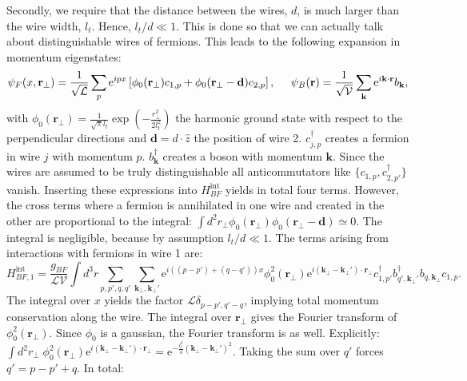 Secondly, we require that the distance between the wires, $d$, is much larger than the wire width, $l_t$. Hence, $l_t/d \ll 1$. This is done so that we can actually talk about distinguishable wires of fermions. This leads to the following expansion in momentum eigenstates:
\begin{equation}
\psi_F(x,\mathbf{r}_\perp) = \frac{1}{\sqrt{\mathcal{L}}}\sum_p \text{e}^{ipx} \left[\phi_0(\mathbf{r}_\perp) c_{1,p} + \phi_0(\mathbf{r}_\perp - \mathbf{d}) c_{2,p}\right], \hspace{0.5cm} \psi_B(\mathbf{r}) = \frac{1}{\sqrt{\mathcal{V}}}\sum_{\mathbf{k}} \text{e}^{i\mathbf{k}\cdot \mathbf{r}} b_\mathbf{k}, 
\end{equation}  
with $\phi_0(\mathbf{r}_\perp) = \frac{1}{\sqrt{\pi}l_t}\exp\left(-\frac{r_\perp^2}{2l_t^2}\right)$ the harmonic ground state with respect to the perpendicular directions and $\mathbf{d} = d\cdot\hat{z}$ the position of wire 2. $c^\dagger_{j,p}$ creates a fermion in wire $j$ with momentum $p$. $b^\dagger_\mathbf{k}$ creates a boson with momentum $\mathbf{k}$. Since the wires are assumed to be truly distinguishable all anticommutators like $\{c_{1,p}, c^\dagger_{2,p'}\}$ vanish. Inserting these expressions into $H_{BF}^\text{int}$ yields in total four terms. However, the cross terms where a fermion is annihilated in one wire and created in the other are proportional to the integral: $\int d^2 r_\perp \phi_0(\mathbf{r}_\perp)\phi_0(\mathbf{r}_\perp-\mathbf{d}) \simeq 0$. The integral is negligible, because by assumption $l_t/d \ll 1$. The terms arising from interactions with fermions in wire 1 are:
\begin{equation}
H_{BF, 1}^{\text{int}} = \frac{g_{BF}}{\mathcal{LV}}\int d^3 r \sum_{p,p',q,q'}\sum_{\mathbf{k}_{\perp},\mathbf{k}_{\perp}'}\text{e}^{i((p-p')+(q-q'))x} \phi^2_0(\mathbf{r}_{\perp})\text{e}^{i(\mathbf{k}_{\perp} - \mathbf{k}_{\perp}')\cdot \mathbf{r}_\perp} c^\dagger_{1,p'} b^\dagger_{q',\mathbf{k}_\perp'}b_{q,\mathbf{k}_\perp}c_{1,p}. \nonumber
\end{equation}
The integral over $x$ yields the factor $\mathcal{L}\delta_{p-p',q'-q}$, implying total momentum conservation along the wire. The integral over $\mathbf{r}_\perp$ gives the Fourier transform of $\phi_0^2(\mathbf{r}_\perp)$. Since $\phi_0$ is a gaussian, the Fourier transform is as well. Explicitly: $\int d^2 r_\perp \; \phi^2_0(\mathbf{r}_{\perp})\text{e}^{i(\mathbf{k}_{\perp}-\mathbf{k}_{\perp}')\cdot \mathbf{r}_\perp} = \text{e}^{-\frac{l_t^2}{4}(\mathbf{k}_{\perp}-\mathbf{k}_{\perp}')^2}$. Taking the sum over $q'$ forces $q' = p - p' + q$. In total:
